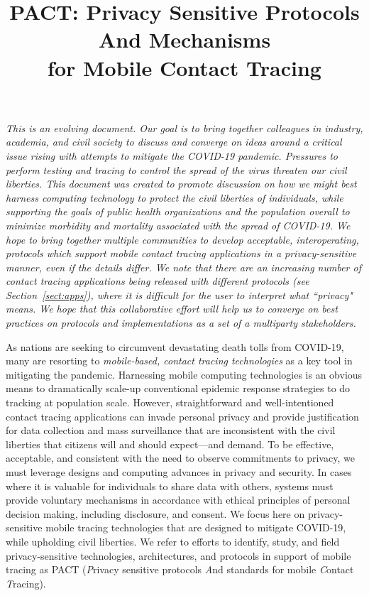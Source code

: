 \documentclass{article}
\title{{\Huge PACT\/}:   {\Huge P\/}rivacy Sensitive Protocols {\Huge A\/}nd Mechanisms
\\for Mobile {\Huge C\/}ontact {\Huge T\/}racing }
\date{}
\begin{document}
\maketitle

\emph{This is an evolving document. Our goal is to bring together colleagues in industry, academia, and civil society to discuss and converge on ideas around a critical issue rising with attempts to mitigate the COVID-19 pandemic. Pressures to perform testing and tracing to control the spread of the virus threaten our civil liberties. 
This document was created to promote discussion on how we might best harness computing technology to protect the civil liberties of individuals, while supporting the goals of public health organizations and the population overall to minimize morbidity and mortality associated with the spread of COVID-19. 
We hope to bring together multiple communities to develop acceptable, interoperating, protocols which support mobile contact tracing applications in a privacy-sensitive manner, even if the details differ. We note that there are an increasing number of contact tracing applications being released with different protocols (see Section~\ref{sect:apps}), where it is difficult for the user to interpret what ``privacy" means. We hope that this collaborative effort will help us to converge on best practices on protocols and implementations as a set of a multiparty stakeholders.
}

As nations are seeking to circumvent devastating death tolls from COVID-19, many are resorting to \emph{mobile-based, contact tracing technologies} as a key tool in mitigating the pandemic. Harnessing mobile computing technologies is an obvious means to dramatically scale-up conventional epidemic response strategies to do tracking at population scale. However, straightforward and well-intentioned contact tracing applications can invade personal privacy and provide justification for data collection and mass surveillance that are inconsistent with the civil liberties that citizens will and should expect---and demand. To be effective, acceptable, and consistent with the need to observe commitments to  privacy, we must leverage designs and computing advances in privacy and security. In cases where it is valuable for individuals to share data with others, systems must provide voluntary mechanisms in accordance with ethical principles of personal decision making, including disclosure, and consent. We focus here on privacy-sensitive mobile tracing technologies that are designed to mitigate COVID-19, while upholding civil liberties. We refer to efforts to identify, study, and field  privacy-sensitive technologies, architectures, and protocols in support of mobile tracing as PACT (\emph{P}rivacy sensitive protocols \emph{A}nd standards for mobile \emph{C}ontact \emph{T}racing).
\end{document}
